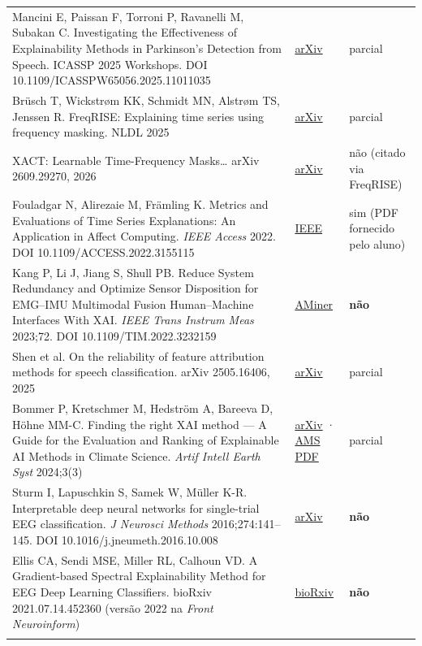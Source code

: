 \documentclass[11pt,a4paper]{article}
\begin{document}
{\begin{xltabular}{\linewidth}{>{\raggedright\arraybackslash}X>{\raggedright\arraybackslash}X>{\raggedright\arraybackslash}X}
Mancini E, Paissan F, Torroni P, Ravanelli M, Subakan C. Investigating the Effectiveness of Explainability Methods in Parkinson's Detection from Speech. ICASSP 2025 Workshops. DOI 10.1109/ICASSPW65056.2025.11011035 & \href{https://arxiv.org/abs/2411.08013}{arXiv} & parcial \\ \addlinespace[1pt]
Brüsch T, Wickstrøm KK, Schmidt MN, Alstrøm TS, Jenssen R. FreqRISE: Explaining time series using frequency masking. NLDL 2025 & \href{https://arxiv.org/abs/2406.13584}{arXiv} & parcial \\ \addlinespace[1pt]
XACT: Learnable Time-Frequency Masks… arXiv 2609.29270, 2026 & \href{https://arxiv.org/abs/2609.29270}{arXiv} & não (citado via FreqRISE) \\ \addlinespace[1pt]
Fouladgar N, Alirezaie M, Främling K. Metrics and Evaluations of Time Series Explanations: An Application in Affect Computing. \textit{IEEE Access} 2022. DOI 10.1109/ACCESS.2022.3155115 & \href{https://doi.org/10.1109/ACCESS.2022.3155115}{IEEE} & sim (PDF fornecido pelo aluno) \\ \addlinespace[1pt]
Kang P, Li J, Jiang S, Shull PB. Reduce System Redundancy and Optimize Sensor Disposition for EMG–IMU Multimodal Fusion Human–Machine Interfaces With XAI. \textit{IEEE Trans Instrum Meas} 2023;72. DOI 10.1109/TIM.2022.3232159 & \href{https://www.aminer.org/pub/63aa20f090e50fcafd47f41d/reduce-system-redundancy-and-optimize-sensor-disposition-for-emg-imu-multimodal-fusion}{AMiner} & \textbf{não} \\ \addlinespace[1pt]
Shen et al. On the reliability of feature attribution methods for speech classification. arXiv 2505.16406, 2025 & \href{https://arxiv.org/abs/2505.16406}{arXiv} & parcial \\ \addlinespace[1pt]
Bommer P, Kretschmer M, Hedström A, Bareeva D, Höhne MM-C. Finding the right XAI method — A Guide for the Evaluation and Ranking of Explainable AI Methods in Climate Science. \textit{Artif Intell Earth Syst} 2024;3(3) & \href{https://arxiv.org/abs/2303.00652}{arXiv} · \href{https://journals.ametsoc.org/view/journals/aies/3/3/AIES-D-23-0074.1.pdf}{AMS PDF} & parcial \\ \addlinespace[1pt]
Sturm I, Lapuschkin S, Samek W, Müller K-R. Interpretable deep neural networks for single-trial EEG classification. \textit{J Neurosci Methods} 2016;274:141–145. DOI 10.1016/j.jneumeth.2016.10.008 & \href{https://arxiv.org/abs/1604.08201}{arXiv} & \textbf{não} \\ \addlinespace[1pt]
Ellis CA, Sendi MSE, Miller RL, Calhoun VD. A Gradient-based Spectral Explainability Method for EEG Deep Learning Classifiers. bioRxiv 2021.07.14.452360 (versão 2022 na \textit{Front Neuroinform}) & \href{https://www.biorxiv.org/content/10.1101/2021.07.14.452360v2}{bioRxiv} & \textbf{não} \\ \addlinespace[1pt]

\end{xltabular}}
\end{document}
